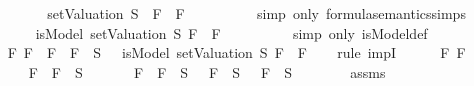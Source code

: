 \begin{isabellebody}
\ \ \ \ \ \ \isamarkupfalse%
\ \isamarkupfalse%
\ {\isachardoublequoteopen}{\isacharparenleft}setValuation\ S{\isacharparenright}\ {\isasymTurnstile}\ {\isacharparenleft}F{}\ \isactrlbold {\isasymor}\ F{}{\isacharparenright}{\isachardoublequoteclose}\isanewline
\ \ \ \ \ \ \ \ \isamarkupfalse%
\ {\isacharparenleft}simp\ only{\isacharcolon}\ formula{\isacharunderscore}semantics{\isachardot}simps{\isacharparenleft}{}{\isacharparenright}{\isacharparenright}\isanewline
\ \ \ \ \ \ \isamarkupfalse%
\ {\isachardoublequoteopen}isModel\ {\isacharparenleft}setValuation\ S{\isacharparenright}\ {\isacharparenleft}F{}\ \isactrlbold {\isasymor}\ F{}{\isacharparenright}{\isachardoublequoteclose}\isanewline
\ \ \ \ \ \ \ \ \isamarkupfalse%
\ {\isacharparenleft}simp\ only{\isacharcolon}\ isModel{\isacharunderscore}def{\isacharparenright}\isanewline
\ \ \ \ \isamarkupfalse%
\isanewline
\ \ \isamarkupfalse%
\isanewline
{}\isamarkupfalse%
\isanewline
\ \ \isamarkupfalse%
\ {\isachardoublequoteopen}{\isasymAnd}F{}\ F{}{\isachardot}\ \isactrlbold {\isasymnot}\ {\isacharparenleft}F{}\ \isactrlbold {\isasymor}\ F{}{\isacharparenright}\ {\isasymin}\ S\ {\isasymlongrightarrow}\ {\isasymnot}\ isModel\ {\isacharparenleft}setValuation\ S{\isacharparenright}\ {\isacharparenleft}F{}\ \isactrlbold {\isasymor}\ F{}{\isacharparenright}{\isachardoublequoteclose}\isanewline
\ \ \isamarkupfalse%
\ {\isacharparenleft}rule\ impI{\isacharparenright}\isanewline
\ \ \ \ \isamarkupfalse%
\ F{}\ F{}\isanewline
\ \ \ \ \isamarkupfalse%
\ {\isachardoublequoteopen}\isactrlbold {\isasymnot}\ {\isacharparenleft}F{}\ \isactrlbold {\isasymor}\ F{}{\isacharparenright}\ {\isasymin}\ S{\isachardoublequoteclose}\isanewline
\ \ \ \ \isamarkupfalse%
\ {\isachardoublequoteopen}\isactrlbold {\isasymnot}\ {\isacharparenleft}F{}\ \isactrlbold {\isasymor}\ F{}{\isacharparenright}\ {\isasymin}\ S\ {\isasymlongrightarrow}\ \isactrlbold {\isasymnot}\ F{}\ {\isasymin}\ S\ {\isasymand}\ \isactrlbold {\isasymnot}\ F{}\ {\isasymin}\ S{\isachardoublequoteclose}\isanewline
\ \ \ \ \ \ \isamarkupfalse%
\ assms{\isacharparenleft}{}{\isacharparenright}\ \isamarkupfalse%

\end{isabellebody}
